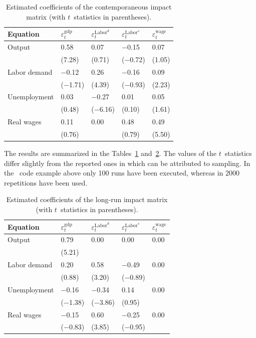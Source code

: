 \documentclass[nojss]{jss}
\begin{document}
\begin{table}[t]
\begin{center}
\begin{tabular}{@{}lllll@{}}
\toprule
\multicolumn{1}{l}{Equation}&
\multicolumn{1}{l}{$\varepsilon_t^{\mathrm{gdp}}$}&
\multicolumn{1}{l}{$\varepsilon_t^{\mathrm{Labor}^d}$}&
\multicolumn{1}{l}{$\varepsilon_t^{\mathrm{Labor}^s}$}&
\multicolumn{1}{l}{$\varepsilon_t^{\mathrm{wage}}$}
\\
\midrule    
Output & 0.58 & 0.07 & $-$0.15 & 
0.07\\
& (7.28) & (0.71) & ($-$0.72) & 
(1.05)\\
Labor demand & $-$0.12 & 0.26 & $-$0.16 & 
0.09\\
& ($-$1.71) & (4.39) & ($-$0.93) & 
(2.23)\\
Unemployment & 0.03 & $-$0.27 & 0.01 & 
0.05\\
& (0.48) & ($-$6.16) & (0.10) & 
(1.61)\\
Real wages & 0.11 & 0.00 & 0.48 & 
0.49\\
& (0.76) &  & (0.79) & 
(5.50)\\
\bottomrule
\end{tabular}
\end{center}
\caption{Estimated coefficients of the contemporaneous impact matrix (with $t$~statistics in parentheses).}
\label{tab-6}
\end{table}

The results are summarized in the Tables~\ref{tab-6} and~\ref{tab-7}. The
values of the $t$~statistics differ slightly from the reported ones in
\citet{BRE2004} which can be attributed to sampling. In the
~code example above only 100 runs have been executed,
whereas in \citet{BRE2004} 2000 repetitions have been used.
 
\begin{table}
\begin{center}
\begin{tabular}{@{}lllll@{}}
\toprule
\multicolumn{1}{l}{Equation}&
\multicolumn{1}{l}{$\varepsilon_t^{\mathrm{gdp}}$}&
\multicolumn{1}{l}{$\varepsilon_t^{\mathrm{Labor}^d}$}&
\multicolumn{1}{l}{$\varepsilon_t^{\mathrm{Labor}^s}$}&
\multicolumn{1}{l}{$\varepsilon_t^{\mathrm{wage}}$}
\\
\midrule    
Output & 0.79 & 0.00 & 0.00 & 
0.00\\
& (5.21) &  &  & \\
Labor demand & 0.20 & 0.58 & $-$0.49 & 
0.00\\
& (0.88) & (3.20) & ($-$0.89) & \\
Unemployment & $-$0.16 & $-$0.34 & 0.14 & 
0.00\\
& ($-$1.38) & ($-$3.86) & (0.95) & \\
Real wages & $-$0.15 & 0.60 & $-$0.25 & 
0.00\\
& ($-$0.83) & (3.85) & ($-$0.95) & \\
\bottomrule
\end{tabular}
\end{center}
\caption{Estimated coefficients of the long-run impact matrix (with $t$~statistics in parentheses).}
\label{tab-7}
\end{table}
\end{document}
